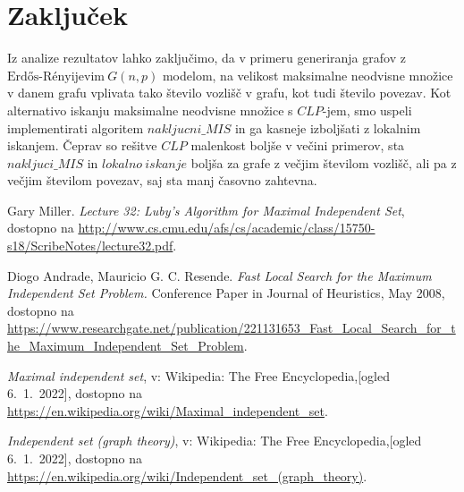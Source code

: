 \documentclass[a4paper, 12pt]{article}
\begin{document}
\section{Zaključek}

Iz analize rezultatov lahko zaključimo, da v primeru generiranja grafov z \\
$\text{Erdős-Rényijevim}\ G(n, p)$ modelom, na velikost maksimalne neodvisne množice v danem grafu
vplivata tako število vozlišč v grafu, kot tudi število povezav. Kot alternativo iskanju maksimalne neodvisne množice s $CLP$-jem, smo uspeli implementirati algoritem $nakljucni\_MIS$
in ga kasneje izboljšati z lokalnim iskanjem. Čeprav so rešitve $CLP$ malenkost boljše v večini primerov, sta $nakljuci\_MIS$ in $lokalno\ iskanje$ boljša za grafe z večjim številom vozlišč,
ali pa z večjim številom povezav, saj sta manj časovno zahtevna.

\newpage

\begin{thebibliography}{9}    

    Gary Miller.
    \textit{Lecture 32: Luby’s Algorithm for Maximal Independent Set}, dostopno na \url{http://www.cs.cmu.edu/afs/cs/academic/class/15750-s18/ScribeNotes/lecture32.pdf}.

    Diogo Andrade, Mauricio G. C. Resende.
    \textit{Fast Local Search for the Maximum Independent Set Problem.} Conference Paper in Journal of Heuristics, May 2008, 
    dostopno na \url{https://www.researchgate.net/publication/221131653_Fast_Local_Search_for_the_Maximum_Independent_Set_Problem}.

    \textit{Maximal independent set}, v: Wikipedia: The Free Encyclopedia,[ogled 6.~1.~2022], dostopno na \url{https://en.wikipedia.org/wiki/Maximal_independent_set}.

    \textit{Independent set (graph theory)}, v: Wikipedia: The Free Encyclopedia,[ogled 6.~1.~2022], dostopno na \url{https://en.wikipedia.org/wiki/Independent_set_(graph_theory)}.

    
\end{thebibliography}
\end{document}

